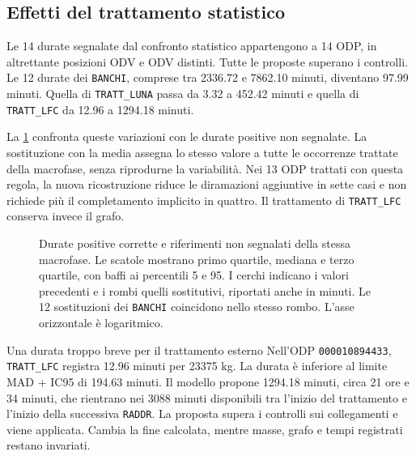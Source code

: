 \subsection{Effetti del trattamento statistico}
\label{sec:duration-imputation-results}

Le 14 durate segnalate dal confronto statistico appartengono a 14 ODP, in altrettante posizioni ODV e ODV distinti. Tutte le proposte superano i controlli. Le 12 durate dei \texttt{BANCHI}, comprese tra \num{2336.72} e \num{7862.10} minuti, diventano \num{97.99} minuti. Quella di \texttt{TRATT\_LUNA} passa da \num{3.32} a \num{452.42} minuti e quella di \texttt{TRATT\_LFC} da \num{12.96} a \num{1294.18} minuti.

La \cref{fig:duration-imputation-effects} confronta queste variazioni con le durate positive non segnalate. La sostituzione con la media assegna lo stesso valore a tutte le occorrenze trattate della macrofase, senza riprodurne la variabilità. Nei 13 ODP trattati con questa regola, la nuova ricostruzione riduce le diramazioni aggiuntive in sette casi e non richiede più il completamento implicito in quattro. Il trattamento di \texttt{TRATT\_LFC} conserva invece il grafo.

\begin{figure}[htbp]
\centering
{}
\caption{Durate positive corrette e riferimenti non segnalati della stessa macrofase. Le scatole mostrano primo quartile, mediana e terzo quartile, con baffi ai percentili 5 e 95. I cerchi indicano i valori precedenti e i rombi quelli sostitutivi, riportati anche in minuti. Le 12 sostituzioni dei \texttt{BANCHI} coincidono nello stesso rombo. L'asse orizzontale è logaritmico.}
\label{fig:duration-imputation-effects}
\end{figure}

\begingroup
{}
\begin{examplebox}{Una durata troppo breve per il trattamento esterno}
Nell'ODP \texttt{000010894433}, \texttt{TRATT\_LFC} registra \num{12.96} minuti per \num{23375} kg. La durata è inferiore al limite MAD + IC95 di \num{194.63} minuti. Il modello propone \num{1294.18} minuti, circa 21 ore e 34 minuti, che rientrano nei \num{3088} minuti disponibili tra l'inizio del trattamento e l'inizio della successiva \texttt{RADDR}. La proposta supera i controlli sui collegamenti e viene applicata. Cambia la fine calcolata, mentre masse, grafo e tempi registrati restano invariati.
\end{examplebox}
\endgroup

